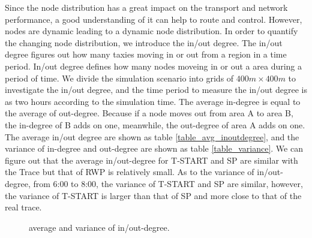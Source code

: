 Since the node distribution has a great impact on the transport and network performance, a good understanding of it can help to route and control.  However, nodes are dynamic leading to a dynamic node distribution. In order to quantify the changing node distribution,  we introduce the in/out degree. The in/out degree figures out how many taxies moving in or out from a region in a time period. In/out degree defines how many nodes moveing in or out a area during a period of time. 
We divide the simulation scenario into grids of $ 400m \times 400 m$ to investigate the in/out degree, and the time period to measure the in/out degree is as two hours according to the simulation time. 
The average in-degree is equal to the average of out-degree. Because if a node moves out from area A to area B, the in-degree of B adds on one, meanwhile, the out-degree of area A adds on one. The average in/out degree are shown as table \ref{table_avg_inoutdegree}, and the variance of in-degree and out-degree are shown as table \ref{table_variance}.
We can figure out that the average in/out-degree for T-START and SP are similar with the Trace but that of RWP is relatively small. As to the variance of in/out-degree, from 6:00 to 8:00, the variance of T-START and SP are similar, however, the variance of T-START is larger than that of SP and more close to that of the real trace.  
\begin{figure}[!h]
\centering
{}
\caption{average and variance of in/out-degree.}\label{figure_avg}
\end{figure}

